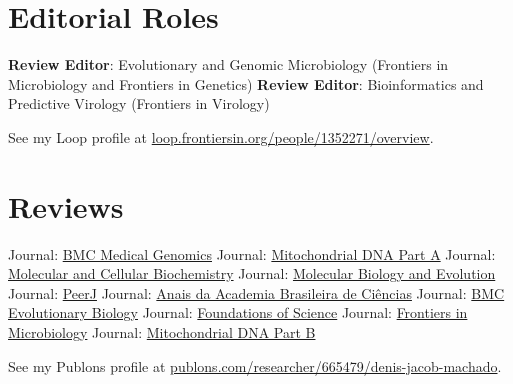 
\section{Editorial Roles}

	    {\textbf{Review Editor}: Evolutionary and Genomic Microbiology (Frontiers in Microbiology and Frontiers in Genetics)}
	\cvline{---}
	    {\textbf{Review Editor}: Bioinformatics and Predictive Virology (Frontiers in Virology)}

\vspace{0.5em}

See my Loop profile at  \href{https://loop.frontiersin.org/people/1352271/overview}{loop.frontiersin.org/people/1352271/overview}.

\section{Reviews}

	    {Journal: \href{https://bmcmedgenomics.biomedcentral.com/?gclid=CjwKCAjwrPCGBhALEiwAUl9X02eq5n6VLJ16fWlJrdFIVyGvqligO-_5N1em5soDXeFFqL7AyHJ6CxoCCX4QAvD_BwE}{BMC Medical Genomics}}
		{Journal: \href{https://www.tandfonline.com/loi/imdn20}{Mitochondrial DNA Part A}}
	\cvline{---}
	    {Journal: \href{https://www.springer.com/journal/11010/?gclid=Cj0KCQjwoJX8BRCZARIsAEWBFMLKBYnPcerYvwBvi0o_0fPoNuCnGz_5XU9lYKC91oSA7LozsZKev0saAuNLEALw_wcB}{Molecular and Cellular Biochemistry}}
	\cvline{---}
		{Journal: \href{https://academic.oup.com/mbe}{Molecular Biology and Evolution}}
	\cvline{---}
		{Journal: \href{https://peerj.com/}{PeerJ}}
	    {Journal: \href{https://www.scielo.br/scielo.php?script=sci_serial&pid=0001-3765&lng=en&nrm=iso}{Anais da Academia Brasileira de Ciências}}
	\cvline{---}
		{Journal: \href{https://bmcevolbiol.biomedcentral.com/}{BMC Evolutionary Biology}}
	\cvline{---}
		{Journal: \href{https://www.springer.com/journal/10699}{Foundations of Science}}
	\cvline{---}
	    {Journal: \href{https://www.frontiersin.org/journals/microbiology}{Frontiers in Microbiology}}
	\cvline{---}
		{Journal: \href{https://www.tandfonline.com/toc/tmdn20/current}{Mitochondrial DNA Part B}}

\vspace{0.5em}

See my Publons profile at  \href{https://publons.com/researcher/665479/denis-jacob-machado/}{publons.com/researcher/665479/denis-jacob-machado}.
